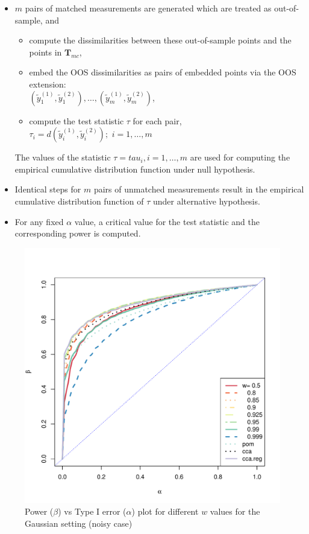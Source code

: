 \documentclass[12pt,oneside,final]{thesis}
\begin{document}
\begin{itemize}
\item  $m$ pairs of matched   measurements are generated which are treated as out-of-sample, and 
\begin{itemize}
\item compute the dissimilarities  %
 between these out-of-sample  points and the points in ${\mathbf{T}_{mc}}$,  
\item  embed the OOS dissimilarities as pairs of embedded points via the OOS extension:\\
 $(\tilde{y}_1^{(1)},\tilde{y}_1^{(2)}),\ldots, (\tilde{y}_m^{(1)},\tilde{y}_m^{(2)})$, 
\item compute the test statistic $\tau$ for each pair, $\tau_i=d(\tilde{y}_i^{(1)},\tilde{y}_i^{(2)});\hspace{4pt}
i=1,\ldots,m$
\end{itemize}
 The values of the statistic $\tau={tau_i,i=1,\ldots,m}$ are used for computing  the empirical cumulative distribution function under null hypothesis. 

\item Identical steps for $m$ pairs of unmatched measurements result in the empirical cumulative distribution  function of $\tau$ under alternative hypothesis.
\item For any fixed $\alpha$ value, a critical value for the test statistic and the corresponding power is computed.
\end{itemize}



\begin{figure}
\includegraphics[scale=0.75]{MVN-FC-Tradeoff-OOS-c0_01.pdf}
\caption{Power ($\beta$) vs Type I error ($\alpha$) plot for different $w$ values for the Gaussian setting (noisy case)}
\label{fig:MVN-c001-power-alpha}
\end{figure}
\end{document}
